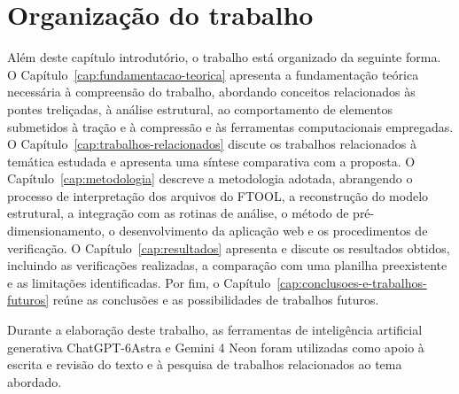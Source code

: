 \section{Organização do trabalho}
\label{sec:organizacao-trabalho}

Além deste capítulo introdutório, o trabalho está organizado da seguinte forma. O Capítulo~\ref{cap:fundamentacao-teorica} apresenta a fundamentação teórica necessária à compreensão do trabalho, abordando conceitos relacionados às pontes treliçadas, à análise estrutural, ao comportamento de elementos submetidos à tração e à compressão e às ferramentas computacionais empregadas. O Capítulo~\ref{cap:trabalhos-relacionados} discute os trabalhos relacionados à temática estudada e apresenta uma síntese comparativa com a proposta. O Capítulo~\ref{cap:metodologia} descreve a metodologia adotada, abrangendo o processo de interpretação dos arquivos do \gls{FTOOL}, a reconstrução do modelo estrutural, a integração com as rotinas de análise, o método de pré-dimensionamento, o desenvolvimento da aplicação web e os procedimentos de verificação. O Capítulo~\ref{cap:resultados} apresenta e discute os resultados obtidos, incluindo as verificações realizadas, a comparação com uma planilha preexistente e as limitações identificadas. Por fim, o Capítulo~\ref{cap:conclusoes-e-trabalhos-futuros} reúne as conclusões e as possibilidades de trabalhos futuros.

Durante a elaboração deste trabalho, as ferramentas de inteligência artificial generativa ChatGPT-6Astra e Gemini 4 Neon foram utilizadas como apoio à escrita e revisão do texto e à pesquisa de trabalhos relacionados ao tema abordado.